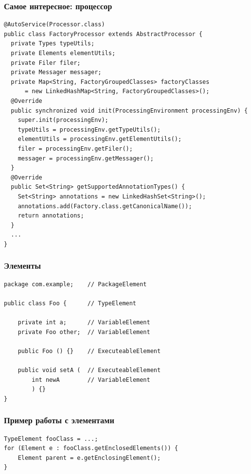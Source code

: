 \documentclass[xetex,mathserif,serif]{beamer}
\begin{document}
	\begin{frame}[fragile]
		\frametitle{Самое интересное: процессор}
		\begin{scriptsize}
			\begin{verbatim}
@AutoService(Processor.class)
public class FactoryProcessor extends AbstractProcessor {
  private Types typeUtils;
  private Elements elementUtils;
  private Filer filer;
  private Messager messager;
  private Map<String, FactoryGroupedClasses> factoryClasses 
      = new LinkedHashMap<String, FactoryGroupedClasses>();
  @Override
  public synchronized void init(ProcessingEnvironment processingEnv) {
    super.init(processingEnv);
    typeUtils = processingEnv.getTypeUtils();
    elementUtils = processingEnv.getElementUtils();
    filer = processingEnv.getFiler();
    messager = processingEnv.getMessager();
  }
  @Override
  public Set<String> getSupportedAnnotationTypes() {
    Set<String> annotations = new LinkedHashSet<String>();
    annotations.add(Factory.class.getCanonicalName());
    return annotations;
  }
  ...
}
			\end{verbatim}
		\end{scriptsize}
	\end{frame}

	\begin{frame}[fragile]
		\frametitle{Элементы}
		\begin{small}
			\begin{verbatim}
package com.example;    // PackageElement

public class Foo {      // TypeElement

    private int a;      // VariableElement
    private Foo other;  // VariableElement

    public Foo () {}    // ExecuteableElement

    public void setA (  // ExecuteableElement
        int newA        // VariableElement
        ) {}
}
			\end{verbatim}
		\end{small}
	\end{frame}

	\begin{frame}[fragile]
		\frametitle{Пример работы с элементами}
		\begin{verbatim}
TypeElement fooClass = ...;
for (Element e : fooClass.getEnclosedElements()) {
    Element parent = e.getEnclosingElement();
}
		\end{verbatim}
	\end{frame}
\end{document}
